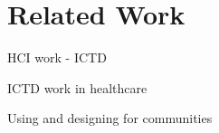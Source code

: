 \section{Related Work}

\begin{comment}
There are two, or three ways to do this. The first is to not do a RW section at all. In this case, you let the data/analysis connect with prior work as you go along. It would be nice if this could be sufficient but most often it is not. Further, people expect a section on prior work so you make it easier for reviewers to understand which body of work you are drawing on and extending.
 And yes, always draw on and extend. You want to contribute to a body of knowledge that already exists, because together as academics, that is our goal. However, you also want to extend that body of knowledge (otherwise why write this paper?). 
The second way to do this is to break RW down into subsections that are like circles in a venn diagram. Your research falls into the intersection of those circles. They may or may not intersect at multiple points. The important thing is to cover every paper that has a leaning/focus similar to yours. So you could do -- “Our paper builds on XYZ work. Here’s X and here’s how we extend it. Here’s Y and …”
The third (and slightly more preferable way, according to me) is to make the related work section flow instead of have it broken down into these discrete sections like I just mentioned. Tell it like a story, not like a list of papers. Make it seem thoughtful and nuanced, instead of a “1, 2, 3” listing. 
You can look at the Mobile Phones for Maternal Health in Rural India paper that I wrote for CHI 2015 as an example. It is by no means the best way to do this, but it did not raise any eyebrows in the review process, at least. One subsection (or 2-3 paragraphs) could be dedicated just to the theoretical lens, if you are using one.
\end{comment}

\textcolor{red}{}
HCI work - ICTD

ICTD work in healthcare

Using and designing for communities